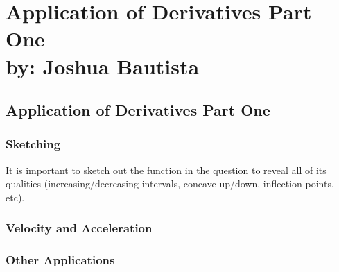 \documentclass[12pt,fleqn]{book} %
\begin{document}
\part{Application of Derivatives Part One\\ by: Joshua Bautista}


\chapter{Application of Derivatives Part One}

\vspace*{-20mm}

\section{Sketching}

\vspace*{-7mm}

It is important to sketch out the function in the question to reveal all of its qualities (increasing/decreasing intervals, concave up/down, inflection points, etc).


\begin{center}

\end{center}


\section{Velocity and Acceleration}



\section{Other Applications}

\begin{center}

\end{center}

\vspace*{-3mm}

\pagebreak

\begin{center}

\end{center}
\end{document}
